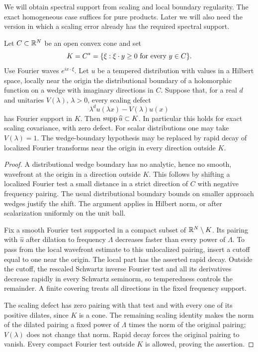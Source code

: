 We will obtain spectral support from scaling and local boundary
regularity.  The exact homogeneous case suffices for pure products.
Later we will also need the version in which a scaling error already
has the required spectral support.

\begin{lemma}\label{R:scaling-spectrum}
Let $C\subset\mathbb R^N$ be an open convex cone and set
\[
 K=C^*=\{\xi:\xi\cdot y\geq0\ \hbox{for every }y\in C\}.
\]
Use Fourier waves $e^{ix\cdot\xi}$.  Let $u$ be a tempered distribution
with values in a Hilbert space, locally near the origin the
distributional boundary of a holomorphic function on a wedge with
imaginary directions in $C$.  Suppose that, for a real $d$ and
unitaries $V(\lambda)$, $\lambda>0$, every scaling defect
\[
 \lambda^d u(\lambda x)-V(\lambda)u(x)
\]
has Fourier support in $K$.  Then $\operatorname{supp}\widehat u\subset K$.
In particular this holds for exact scaling covariance, with zero
defect.  For scalar distributions one may take $V(\lambda)=1$.
The wedge-boundary hypothesis may be replaced by rapid decay of
localized Fourier transforms near the origin in every direction
outside $K$.
\end{lemma}

\begin{proof}
A distributional wedge boundary has no analytic, hence no smooth,
wavefront at the origin in a direction outside $K$.  This follows
by shifting a localized Fourier test a small distance in a strict
direction of $C$ with negative frequency pairing.  The usual
distributional boundary bounds on smaller approach wedges justify
the shift.  The argument applies in Hilbert norm, or after
scalarization uniformly on the unit ball.

Fix a smooth Fourier test supported in a compact subset of
$\mathbb R^N\setminus K$.  Its pairing with $\widehat u$ after dilation
to frequency $\Lambda$ decreases faster than every power of
$\Lambda$.  To pass from the local wavefront estimate to this
unlocalized pairing, insert a cutoff equal to one near the origin.
The local part has the asserted rapid decay.  Outside the cutoff,
the rescaled Schwartz inverse Fourier test and all its derivatives
decrease rapidly in every Schwartz seminorm, so temperedness
controls the remainder.  A finite covering treats all directions
in the fixed frequency support.

The scaling defect has zero pairing with that test and with every
one of its positive dilates, since $K$ is a cone.  The remaining
scaling identity makes the norm of the dilated pairing a fixed
power of $\Lambda$ times the norm of the original pairing;
$V(\lambda)$ does not change that norm.  Rapid decay forces the
original pairing to vanish.  Every compact Fourier test outside
$K$ is allowed, proving the assertion.
\end{proof}

